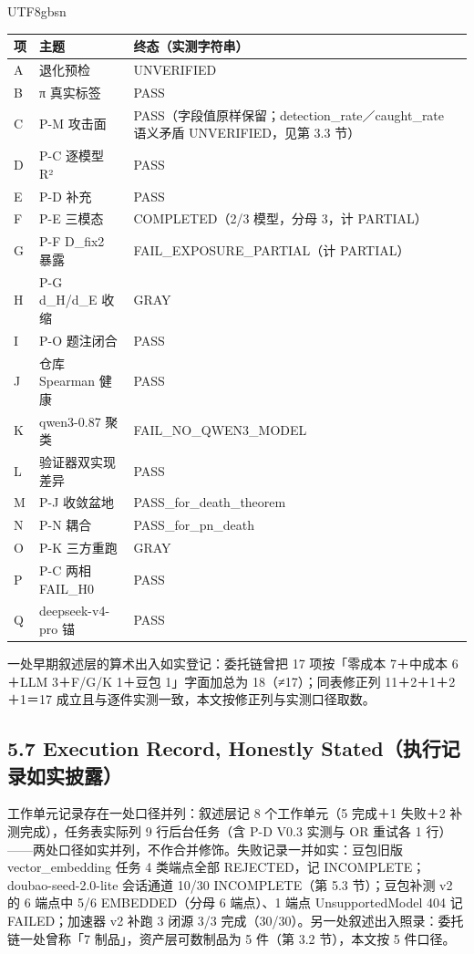 \documentclass[10pt,a4paper]{article}
\begin{document}
\begin{CJK}{UTF8}{gbsn}
\begin{longtable}{>{\raggedright\arraybackslash}p{16pt}>{\raggedright\arraybackslash}p{100pt}>{\raggedright\arraybackslash}p{288pt}}
\toprule
\textbf{项} & \textbf{主题} & \textbf{终态（实测字符串）} \\
\midrule
\endhead
A & 退化预检 & UNVERIFIED \\
B & π 真实标签 & PASS \\
C & P-M 攻击面 & PASS（字段值原样保留；detection\_rate／caught\_rate 语义矛盾 UNVERIFIED，见第 3.3 节） \\
D & P-C 逐模型 R² & PASS \\
E & P-D 补充 & PASS \\
F & P-E 三模态 & COMPLETED（2/3 模型，分母 3，计 PARTIAL） \\
G & P-F D\_fix2 暴露 & FAIL\_EXPOSURE\_PARTIAL（计 PARTIAL） \\
H & P-G d\_H/d\_E 收缩 & GRAY \\
I & P-O 题注闭合 & PASS \\
J & 仓库 Spearman 健康 & PASS \\
K & qwen3-0.87 聚类 & FAIL\_NO\_QWEN3\_MODEL \\
L & 验证器双实现差异 & PASS \\
M & P-J 收敛盆地 & PASS\_for\_death\_theorem \\
N & P-N 耦合 & PASS\_for\_pn\_death \\
O & P-K 三方重跑 & GRAY \\
P & P-C 两相 FAIL\_H0 & PASS \\
Q & deepseek-v4-pro 锚 & PASS \\
\bottomrule
\end{longtable}

一处早期叙述层的算术出入如实登记：委托链曾把 17 项按「零成本 7＋中成本 6＋LLM 3＋F/G/K 1＋豆包 1」字面加总为 18（≠17）；同表修正列 11＋2＋1＋2＋1＝17 成立且与逐件实测一致，本文按修正列与实测口径取数。

\subsection*{5.7 Execution Record, Honestly Stated（执行记录如实披露）}工作单元记录存在一处口径并列：叙述层记 8 个工作单元（5 完成＋1 失败＋2 补测完成），任务表实际列 9 行后台任务（含 P-D V0.3 实测与 OR 重试各 1 行）——两处口径如实并列，不作合并修饰。失败记录一并如实：豆包旧版 vector\_embedding 任务 4 类端点全部 REJECTED，记 INCOMPLETE；doubao-seed-2.0-lite 会话通道 10/30 INCOMPLETE（第 5.3 节）；豆包补测 v2 的 6 端点中 5/6 EMBEDDED（分母 6 端点）、1 端点 UnsupportedModel 404 记 FAILED；加速器 v2 补跑 3 闭源 3/3 完成（30/30）。另一处叙述出入照录：委托链一处曾称「7 制品」，资产层可数制品为 5 件（第 3.2 节），本文按 5 件口径。



\end{CJK}
\end{document}
